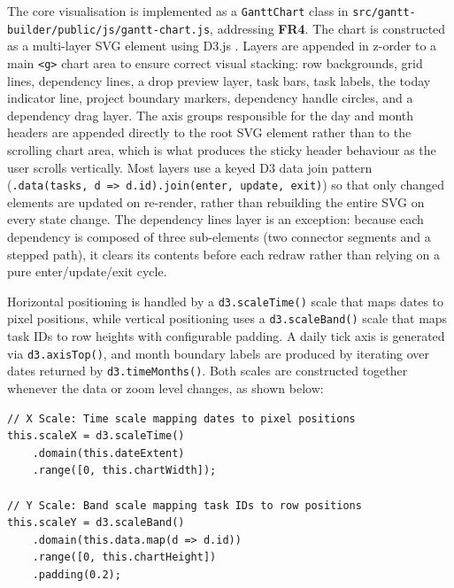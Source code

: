 \documentclass[12pt,nonacm,acmlarge,titlepage,screen]{acmart}
\begin{document}
The core visualisation is implemented as a \texttt{GanttChart} class in                                                                                                      
\texttt{src/gantt-builder/public/js/gantt-chart.js}, addressing \textbf{FR4}\label{fr:4}.
The chart is constructed as a multi-layer SVG element using D3.js
\cite{geeksforgeeks_d3js_2025, w3schools_d3js_2025}. Layers are appended in z-order to
a main \texttt{<g>} chart area to ensure correct visual stacking: row backgrounds, grid
lines, dependency lines, a drop preview layer, task bars, task labels, the today indicator
line, project boundary markers, dependency handle circles, and a dependency drag layer.
The axis groups responsible for the day and month headers are appended directly to the root
SVG element rather than to the scrolling chart area, which is what produces the sticky
header behaviour as the user scrolls vertically. Most layers use a keyed D3 data join
pattern (\texttt{.data(tasks,~d~=>~d.id).join(enter,~update,~exit)}) 
\cite{bostock_d3, geeksforgeeks_d3js_2025, w3schools_d3js_2025} so that only changed
elements are updated on re-render, rather than rebuilding the entire SVG on every state
change. The dependency lines layer is an exception: because each dependency is composed of
three sub-elements (two connector segments and a stepped path), it clears its contents
before each redraw rather than relying on a pure enter/update/exit cycle.

Horizontal positioning is handled by a \texttt{d3.scaleTime()}\cite{bostock_d3, geeksforgeeks_d3js_2025, w3schools_d3js_2025} scale that maps dates to
pixel positions, while vertical positioning uses a \texttt{d3.scaleBand()}\cite{bostock_d3, geeksforgeeks_d3js_2025, w3schools_d3js_2025} scale that maps
task IDs to row heights with configurable padding. A daily tick axis is generated via
\texttt{d3.axisTop()}\cite{bostock_d3, geeksforgeeks_d3js_2025, w3schools_d3js_2025}, and month boundary labels are produced by iterating over dates
returned by \texttt{d3.timeMonths()}\cite{bostock_d3, geeksforgeeks_d3js_2025, w3schools_d3js_2025}. Both scales are constructed together whenever the
data or zoom level changes, as shown below:

\begin{lstlisting}[style=jsstyle, caption={Scale initialisation in GanttChart (gantt-chart.js)}]
// X Scale: Time scale mapping dates to pixel positions
this.scaleX = d3.scaleTime()
    .domain(this.dateExtent)
    .range([0, this.chartWidth]);

// Y Scale: Band scale mapping task IDs to row positions
this.scaleY = d3.scaleBand()
    .domain(this.data.map(d => d.id))
    .range([0, this.chartHeight])
    .padding(0.2);
\end{lstlisting}
\end{document}
